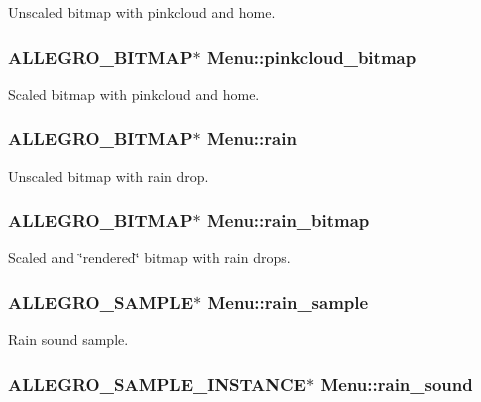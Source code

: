Unscaled bitmap with pinkcloud and home. \hypertarget{structMenu_a970ef9c492ae797fc59d22fa6cfead71}{
\subsubsection[{pinkcloud\-\_\-bitmap}]{\setlength{\rightskip}{0pt plus 5cm}A\-L\-L\-E\-G\-R\-O\-\_\-\-B\-I\-T\-M\-A\-P$\ast$ Menu\-::pinkcloud\-\_\-bitmap}}\label{structMenu_a970ef9c492ae797fc59d22fa6cfead71}
Scaled bitmap with pinkcloud and home. \hypertarget{structMenu_a3ba357f6bd47ac51f9aa9b9c381bbe9f}{
\subsubsection[{rain}]{\setlength{\rightskip}{0pt plus 5cm}A\-L\-L\-E\-G\-R\-O\-\_\-\-B\-I\-T\-M\-A\-P$\ast$ Menu\-::rain}}\label{structMenu_a3ba357f6bd47ac51f9aa9b9c381bbe9f}
Unscaled bitmap with rain drop. \hypertarget{structMenu_a9207cdbfc8c670d9069c9a2c64c6ca95}{
\subsubsection[{rain\-\_\-bitmap}]{\setlength{\rightskip}{0pt plus 5cm}A\-L\-L\-E\-G\-R\-O\-\_\-\-B\-I\-T\-M\-A\-P$\ast$ Menu\-::rain\-\_\-bitmap}}\label{structMenu_a9207cdbfc8c670d9069c9a2c64c6ca95}
Scaled and \char`\"{}rendered\char`\"{} bitmap with rain drops. \hypertarget{structMenu_ad14705d9172d76dc241de8f4657254cc}{
\subsubsection[{rain\-\_\-sample}]{\setlength{\rightskip}{0pt plus 5cm}A\-L\-L\-E\-G\-R\-O\-\_\-\-S\-A\-M\-P\-L\-E$\ast$ Menu\-::rain\-\_\-sample}}\label{structMenu_ad14705d9172d76dc241de8f4657254cc}
Rain sound sample. \hypertarget{structMenu_a31b58f4005206ba8ecc4b6f40223295f}{
\subsubsection[{rain\-\_\-sound}]{\setlength{\rightskip}{0pt plus 5cm}A\-L\-L\-E\-G\-R\-O\-\_\-\-S\-A\-M\-P\-L\-E\-\_\-\-I\-N\-S\-T\-A\-N\-C\-E$\ast$ Menu\-::rain\-\_\-sound}}\label{structMenu_a31b58f4005206ba8ecc4b6f40223295f}
